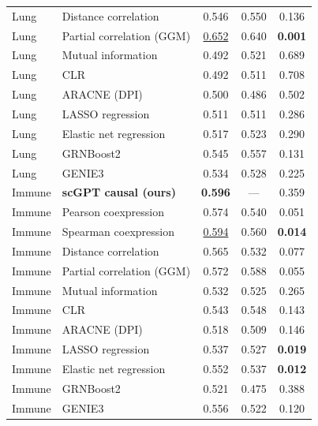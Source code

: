 \documentclass[10pt,letterpaper]{article}
\begin{document}
\begin{table}[!ht]
\begin{tabular}{llccc}
Lung   & Distance correlation             & 0.546 & 0.550 & 0.136 \\
Lung   & Partial correlation (GGM)        & \underline{0.652} & 0.640 & \textbf{0.001} \\
Lung   & Mutual information               & 0.492 & 0.521 & 0.689 \\
Lung   & CLR                              & 0.492 & 0.511 & 0.708 \\
Lung   & ARACNE (DPI)                     & 0.500 & 0.486 & 0.502 \\
Lung   & LASSO regression                 & 0.511 & 0.511 & 0.286 \\
Lung   & Elastic net regression           & 0.517 & 0.523 & 0.290 \\
Lung   & GRNBoost2                        & 0.545 & 0.557 & 0.131 \\
Lung   & GENIE3                           & 0.534 & 0.528 & 0.225 \\
\midrule
Immune & \textbf{scGPT causal (ours)}     & \textbf{0.596} & ---   & 0.359 \\
Immune & Pearson coexpression             & 0.574 & 0.540 & 0.051 \\
Immune & Spearman coexpression            & \underline{0.594} & 0.560 & \textbf{0.014} \\
Immune & Distance correlation             & 0.565 & 0.532 & 0.077 \\
Immune & Partial correlation (GGM)        & 0.572 & 0.588 & 0.055 \\
Immune & Mutual information               & 0.532 & 0.525 & 0.265 \\
Immune & CLR                              & 0.543 & 0.548 & 0.143 \\
Immune & ARACNE (DPI)                     & 0.518 & 0.509 & 0.146 \\
Immune & LASSO regression                 & 0.537 & 0.527 & \textbf{0.019} \\
Immune & Elastic net regression           & 0.552 & 0.537 & \textbf{0.012} \\
Immune & GRNBoost2                        & 0.521 & 0.475 & 0.388 \\
Immune & GENIE3                           & 0.556 & 0.522 & 0.120 \\
\bottomrule
\end{tabular}
\end{table}
\end{document}

